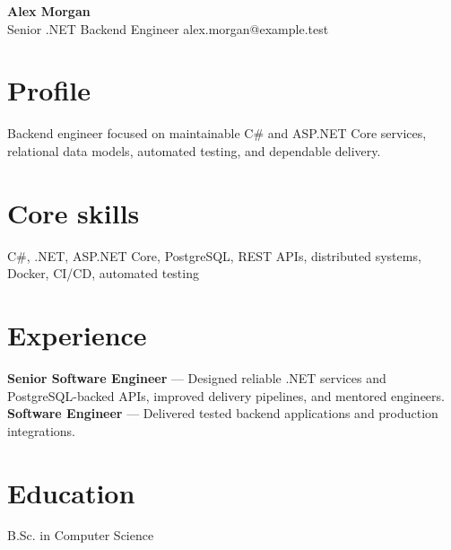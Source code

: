 \documentclass[10pt]{article}
\begin{document}
{\LARGE\textbf{Alex Morgan}}\\
Senior .NET Backend Engineer \hfill alex.morgan@example.test

\section*{Profile}
Backend engineer focused on maintainable C\# and ASP.NET Core services, relational data models, automated testing, and dependable delivery.

\section*{Core skills}
C\#, .NET, ASP.NET Core, PostgreSQL, REST APIs, distributed systems, Docker, CI/CD, automated testing

\section*{Experience}
\textbf{Senior Software Engineer} --- Designed reliable .NET services and PostgreSQL-backed APIs, improved delivery pipelines, and mentored engineers.\\[4pt]
\textbf{Software Engineer} --- Delivered tested backend applications and production integrations.

\section*{Education}
B.Sc. in Computer Science
\end{document}
